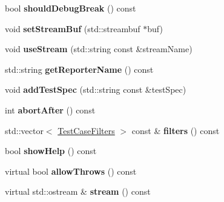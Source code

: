 \begin{DoxyCompactItemize}
\item 
bool {\bfseries should\+Debug\+Break} () const \hypertarget{classCatch_1_1Config_a404b40d7f51f3ee0955e737a4729a162}{}\label{classCatch_1_1Config_a404b40d7f51f3ee0955e737a4729a162}

\item 
void {\bfseries set\+Stream\+Buf} (std\+::streambuf $\ast$buf)\hypertarget{classCatch_1_1Config_adacc2540c7876de06869ba56b14504da}{}\label{classCatch_1_1Config_adacc2540c7876de06869ba56b14504da}

\item 
void {\bfseries use\+Stream} (std\+::string const \&stream\+Name)\hypertarget{classCatch_1_1Config_ad54597f3f1f23f5a1cc862b5029bf231}{}\label{classCatch_1_1Config_ad54597f3f1f23f5a1cc862b5029bf231}

\item 
std\+::string {\bfseries get\+Reporter\+Name} () const \hypertarget{classCatch_1_1Config_a6973175899892f42dd47a1d7701fbed7}{}\label{classCatch_1_1Config_a6973175899892f42dd47a1d7701fbed7}

\item 
void {\bfseries add\+Test\+Spec} (std\+::string const \&test\+Spec)\hypertarget{classCatch_1_1Config_a50283ece0b30d1cd3c8e47588942232a}{}\label{classCatch_1_1Config_a50283ece0b30d1cd3c8e47588942232a}

\item 
int {\bfseries abort\+After} () const \hypertarget{classCatch_1_1Config_a0ab98435c16d87681d370266b8755672}{}\label{classCatch_1_1Config_a0ab98435c16d87681d370266b8755672}

\item 
std\+::vector$<$ \hyperlink{classCatch_1_1TestCaseFilters}{Test\+Case\+Filters} $>$ const \& {\bfseries filters} () const \hypertarget{classCatch_1_1Config_ab91866ab6b895892ac29b4e9cfc1c1dd}{}\label{classCatch_1_1Config_ab91866ab6b895892ac29b4e9cfc1c1dd}

\item 
bool {\bfseries show\+Help} () const \hypertarget{classCatch_1_1Config_a338e89c6dd7c90d2772fc161cb77e9b4}{}\label{classCatch_1_1Config_a338e89c6dd7c90d2772fc161cb77e9b4}

\item 
virtual bool {\bfseries allow\+Throws} () const \hypertarget{classCatch_1_1Config_ae6a5aea5e85afc2886b5ec8e3b610afa}{}\label{classCatch_1_1Config_ae6a5aea5e85afc2886b5ec8e3b610afa}

\item 
virtual std\+::ostream \& {\bfseries stream} () const \hypertarget{classCatch_1_1Config_a51a5f372698eaed4dd89c8bb03d2fdc4}{}\label{classCatch_1_1Config_a51a5f372698eaed4dd89c8bb03d2fdc4}


\end{DoxyCompactItemize}
